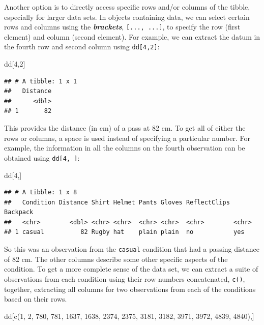 \documentclass[
]{book}
\newenvironment{Shaded}{\begin{snugshade}}{\end{snugshade}}
\newcommand{\DecValTok}[1]{\textcolor[rgb]{0.00,0.00,0.81}{#1}}
\newcommand{\FunctionTok}[1]{\textcolor[rgb]{0.00,0.00,0.00}{#1}}
\newcommand{\NormalTok}[1]{#1}
\begin{document}
Another option is to directly access specific rows and/or columns of the tibble, especially for larger data sets. In objects containing data, we can select certain rows and columns using the \textbf{\emph{brackets}}, \texttt{{[}...,\ ...{]}}, to specify the row (first element) and column (second element). For example, we can extract the datum in the fourth row and second column using \texttt{dd{[}4,2{]}}:

\begin{Shaded}
\begin{Highlighting}[]
\NormalTok{dd[}\DecValTok{4}\NormalTok{,}\DecValTok{2}\NormalTok{]}
\end{Highlighting}
\end{Shaded}

\begin{verbatim}
## # A tibble: 1 x 1
##   Distance
##      <dbl>
## 1       82
\end{verbatim}

This provides the distance (in cm) of a pass at 82 cm. To get all of either the rows or columns, a space is used instead of specifying a particular number. For example, the information in all the columns on the fourth observation can be obtained using \texttt{dd{[}4,\ {]}}:

\begin{Shaded}
\begin{Highlighting}[]
\NormalTok{dd[}\DecValTok{4}\NormalTok{,]}
\end{Highlighting}
\end{Shaded}

\begin{verbatim}
## # A tibble: 1 x 8
##   Condition Distance Shirt Helmet Pants Gloves ReflectClips Backpack
##   <chr>        <dbl> <chr> <chr>  <chr> <chr>  <chr>        <chr>   
## 1 casual          82 Rugby hat    plain plain  no           yes
\end{verbatim}

So this was an observation from the \texttt{casual} condition that had a passing distance of 82 cm. The other columns describe some other specific aspects of the condition. To get a more complete sense of the data set, we can extract a suite of observations from each condition using their row numbers concatenated, \texttt{c()}, together, extracting all columns for two observations from each of the conditions based on their rows.

\begin{Shaded}
\begin{Highlighting}[]
\NormalTok{dd[}\FunctionTok{c}\NormalTok{(}\DecValTok{1}\NormalTok{, }\DecValTok{2}\NormalTok{, }\DecValTok{780}\NormalTok{, }\DecValTok{781}\NormalTok{, }\DecValTok{1637}\NormalTok{, }\DecValTok{1638}\NormalTok{, }\DecValTok{2374}\NormalTok{, }\DecValTok{2375}\NormalTok{, }\DecValTok{3181}\NormalTok{, }\DecValTok{3182}\NormalTok{, }\DecValTok{3971}\NormalTok{, }\DecValTok{3972}\NormalTok{, }\DecValTok{4839}\NormalTok{, }\DecValTok{4840}\NormalTok{),]}
\end{Highlighting}
\end{Shaded}
\end{document}
